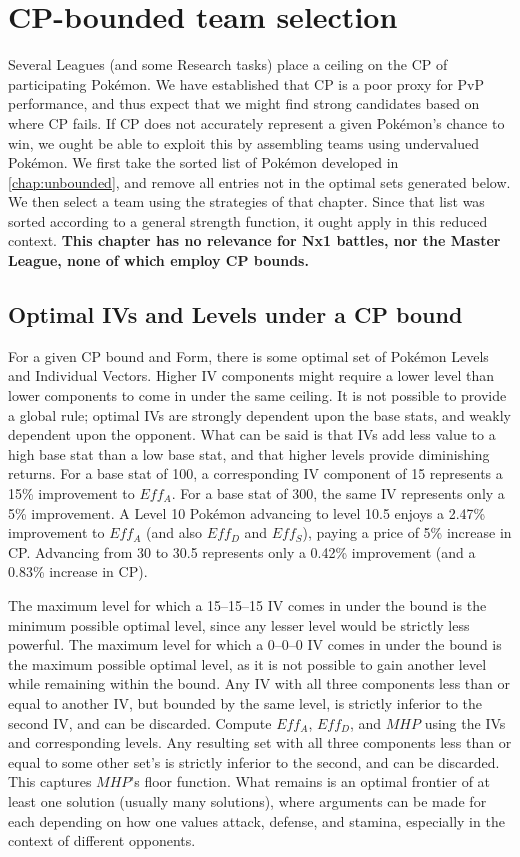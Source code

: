 \chapter{CP-bounded team selection}
\label{chap:bounded}
Several Leagues (and some Research tasks) place a ceiling on the CP of
 participating Pokémon.
We have established that CP is a poor proxy for PvP performance, and thus
 expect that we might find strong candidates based on where CP fails.
If CP does not accurately represent a given Pokémon's chance to win, we ought
 be able to exploit this by assembling teams using undervalued Pokémon.
We first take the sorted list of Pokémon developed in \autoref{chap:unbounded},
 and remove all entries not in the optimal sets generated below.
We then select a team using the strategies of that chapter. Since
 that list was sorted according to a general strength function, it
 ought apply in this reduced context.
\textbf{This chapter has no relevance for Nx1 battles, nor the Master
  League, none of which employ CP bounds.}

\section{Optimal IVs and Levels under a CP bound}
For a given CP bound and Form, there is some optimal set of Pokémon Levels
 and Individual Vectors.
Higher IV components might require a lower level than lower components to
 come in under the same ceiling.
It is not possible to provide a global rule; optimal IVs are strongly
 dependent upon the base stats, and weakly dependent upon the opponent.
What can be said is that IVs add less value to a high base stat than a low
 base stat, and that higher levels provide diminishing returns.
For a base stat of 100, a corresponding IV component of 15 represents a
 15\% improvement to $Eff_A$.
For a base stat of 300, the same IV represents only a 5\% improvement.
A Level 10 Pokémon advancing to level 10.5 enjoys a 2.47\% improvement to
 $Eff_A$ (and also $Eff_D$ and $Eff_S$), paying a price of 5\% increase
 in CP.
Advancing from 30 to 30.5 represents only a 0.42\% improvement (and a
 0.83\% increase in CP).

The maximum level for which a 15--15--15 IV comes in under the bound is the
 minimum possible optimal level, since any lesser level would be strictly less
 powerful.
The maximum level for which a 0--0--0 IV comes in under the bound is the
 maximum possible optimal level, as it is not possible to gain another level
 while remaining within the bound.
Any IV with all three components less than or equal to another IV, but bounded
 by the same level, is strictly inferior to the second IV, and can be discarded.
Compute $Eff_A$, $Eff_D$, and $MHP$ using the IVs and corresponding levels.
Any resulting set with all three components less than or equal to some other set's
 is strictly inferior to the second, and can be discarded.
This captures $MHP$'s floor function.
What remains is an optimal frontier of at least one solution (usually
 many solutions), where arguments can be made for each depending on how one
 values attack, defense, and stamina, especially in the context of different
 opponents.

